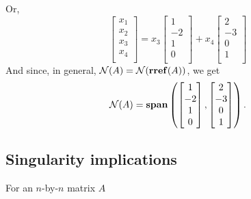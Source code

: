 \documentclass[10pt,letterpaper]{article}
\begin{document}
Or,
\[
\begin{bmatrix}
  x_1 \\
  x_2 \\
  x_3 \\
  x_4 \\
\end{bmatrix}
= x_3
\begin{bmatrix}
  1  \\
  -2 \\
  1  \\
  0  \\
\end{bmatrix}
+ x_4
\begin{bmatrix}
   2 \\
  -3 \\
   0 \\
  1  \\
\end{bmatrix}
\]
And since, in general, $\mathcal{N}(A)= \mathcal{N}( {\bf rref} (A))$, we get
\[
\mathcal{N}(A) = {\bf span} \left(
\begin{bmatrix}
  1  \\
  -2 \\
  1  \\
  0  \\
\end{bmatrix}
,
\begin{bmatrix}
   2 \\
  -3 \\
   0 \\
  1  \\
\end{bmatrix}
\right).
\]
\subsection{Singularity implications}
\label{sec-2_3}

For an $n$-by-$n$ matrix $A$ 
\end{document}
